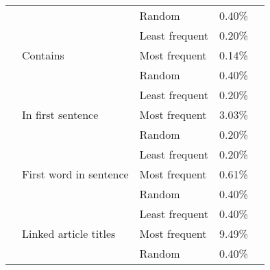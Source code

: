 \begin{center}
\begin{table}[h]
\begin{tabular}{cllll}
\multicolumn{1}{l}{}                                    &                                         & Random                      & 0.40\%  \\ \cline{1-4} 
\multicolumn{1}{l}{} \multirow{12}{*}{Case-insensitive} & \multirow{3}{*}{Contains}               & Least frequent              & 0.20\%  \\ \cline{3-4} 
\multicolumn{1}{l}{}                                    &                                         & Most frequent               & 0.14\%  \\ \cline{3-4} 
\multicolumn{1}{l}{}                                    &                                         & Random                      & 0.40\%  \\ \cline{2-4} 
\multicolumn{1}{l}{}                                    & \multirow{3}{*}{In first sentence}      & Least frequent              & 0.20\%  \\ \cline{3-4} 
\multicolumn{1}{l}{}                                    &                                         & Most frequent               & 3.03\%  \\ \cline{3-4} 
\multicolumn{1}{l}{}                                    &                                         & Random                      & 0.20\%  \\ \cline{2-4} 
\multicolumn{1}{l}{}                                    & \multirow{3}{*}{First word in sentence} & Least frequent              & 0.20\%  \\ \cline{3-4} 
\multicolumn{1}{l}{}                                    &                                         & Most frequent               & 0.61\%  \\ \cline{3-4} 
\multicolumn{1}{l}{}                                    &                                         & Random                      & 0.40\%  \\ \cline{2-4} 
\multicolumn{1}{l}{}                                    & \multirow{3}{*}{Linked article titles}  & Least frequent              & 0.40\%  \\ \cline{3-4} 
\multicolumn{1}{l}{}                                    &                                         & Most frequent               & 9.49\%  \\ \cline{3-4} 
\multicolumn{1}{l}{}									   &                                         & Random                      & 0.40\%  \\ \hline
\end{tabular}
\end{table}
\end{center}

